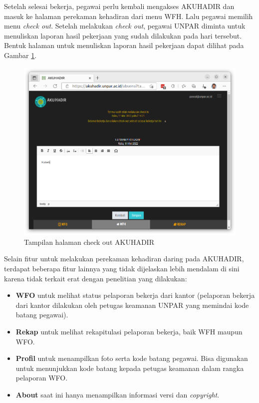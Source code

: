 Setelah selesai bekerja, pegawai perlu kembali mengakses AKUHADIR dan masuk ke halaman perekaman kehadiran dari menu WFH. Lalu pegawai memilih menu \textit{check out}. Setelah melakukan \textit{check out}, pegawai UNPAR diminta untuk menuliskan laporan hasil pekerjaan yang sudah dilakukan pada hari tersebut. Bentuk halaman untuk menuliskan laporan hasil pekerjaan dapat dilihat pada Gambar \ref{fig:akuhadir-4-wfh-checkout}.

\begin{figure}[H]
	\centering
	\includegraphics[scale=0.25]{Gambar/akuhadir-4-wfh-checkout.png}
	\caption{Tampilan halaman check out AKUHADIR} 
	\label{fig:akuhadir-4-wfh-checkout}
\end{figure}
Selain fitur untuk melakukan perekaman kehadiran daring pada AKUHADIR, terdapat beberapa fitur lainnya yang tidak dijelaskan lebih mendalam di sini karena tidak terkait erat dengan penelitian yang dilakukan:

\begin{itemize}
	\item \textbf{WFO} untuk melihat status pelaporan bekerja dari kantor (pelaporan bekerja dari kantor dilakukan oleh petugas keamanan UNPAR yang memindai kode batang pegawai).
	\item \textbf{Rekap} untuk melihat rekapitulasi pelaporan bekerja, baik WFH maupun WFO.
	\item \textbf{Profil} untuk menampilkan foto serta kode batang pegawai. Bisa digunakan untuk menunjukkan kode batang kepada petugas keamanan dalam rangka pelaporan WFO.
	\item \textbf{About} saat ini hanya menampilkan informasi versi dan \textit{copyright}.
\end{itemize}

